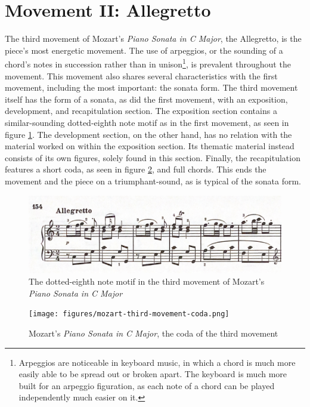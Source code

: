 \section{Movement II: Allegretto}
The third movement of Mozart's \textit{Piano Sonata in C Major}, the Allegretto, is the piece's most energetic movement. The use of arpeggios, or the sounding of a chord's notes in succession rather than in unison\autocite{Arpeggio_2001}\footnote{Arpeggios are noticeable in keyboard music, in which a chord is much more easily able to be spread out or broken apart. The keyboard is much more built for an arpeggio figuration, as each note of a chord can be played independently much easier on it.}, is prevalent throughout the movement. This movement also shares several characteristics with the first movement, including the most important: the sonata form. The third movement itself has the form of a sonata, as did the first movement, with an exposition, development, and recapitulation section. The exposition section contains a similar-sounding dotted-eighth note motif as in the first movement, as seen in figure \ref{fig:mozart-third-movement-dotted-eighth-notes-and-exposition}\autocite{Henle_1977}. The development section, on the other hand, has no relation with the material worked on within the exposition section. Its thematic material instead consists of its own figures, solely found in this section. Finally, the recapitulation features a short coda, as seen in figure \ref{fig:mozart-third-movement-coda}\autocite{Henle_1977}, and full chords. This ends the movement and the piece on a triumphant-sound, as is typical of the sonata form.

\begin{figure}
    \centering
    \includegraphics[width=\textwidth]{figures/mozart-third-movement-dotted-eighth-notes-and-exposition.png}
    \caption{The dotted-eighth note motif in the third movement of Mozart's \textit{Piano Sonata in C Major}}
    \label{fig:mozart-third-movement-dotted-eighth-notes-and-exposition}
\end{figure}

\begin{figure}
    \centering
    \texttt{[image: figures/mozart-third-movement-coda.png]}
    \caption{Mozart's \textit{Piano Sonata in C Major}, the coda of the third movement}
    \label{fig:mozart-third-movement-coda}
\end{figure}
